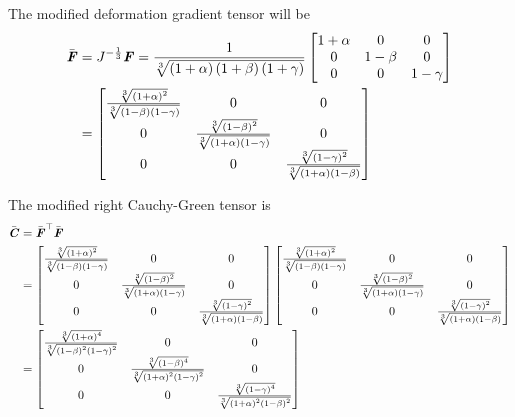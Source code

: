 The modified deformation gradient tensor will be
\begin{equation}
  \begin{split}
    \bar{\boldsymbol{\mathit{F}}}&=J^{-\frac{1}{3}}\boldsymbol{\mathit{F}}=\frac{1}{ \sqrt[3]{\left( 1+\alpha \right)\left( 1+\beta \right)\left( 1+\gamma \right)} }\begin{bmatrix}
      1+\alpha & 0 & 0 \\
      0 & 1-\beta & 0 \\
      0 & 0 & 1-\gamma
    \end{bmatrix}\\
    &=\begin{bmatrix}
    \frac{ \sqrt[3]{\left( 1+\alpha \right)^{2}} }{ \sqrt[3]{\left( 1-\beta \right)\left( 1-\gamma \right)} }
    & 0 & 0 \\
    0 &
    \frac{ \sqrt[3]{\left( 1-\beta \right)^{2}} }{ \sqrt[3]{\left( 1+\alpha \right)\left( 1-\gamma \right)} }
    & 0 \\
    0 & 0 & \frac{ \sqrt[3]{\left( 1-\gamma \right)^{2}} }{ \sqrt[3]{\left( 1+\alpha \right)\left( 1-\beta \right)} }
    \end{bmatrix}
  \end{split}
\end{equation}

The modified right Cauchy-Green tensor is
\begin{equation}
  \begin{split}
    \bar{\boldsymbol{\mathit{C}}} &=  {\bar{\boldsymbol{\mathit{F}}}}^{ \top } \bar{\boldsymbol{\mathit{F}}}\\
    &= \begin{bmatrix}
    \frac{ \sqrt[3]{\left( 1+\alpha \right)^{2}} }{ \sqrt[3]{\left( 1-\beta \right)\left( 1-\gamma \right)} }
    & 0 & 0 \\
    0 &
    \frac{ \sqrt[3]{\left( 1-\beta \right)^{2}} }{ \sqrt[3]{\left( 1+\alpha \right)\left( 1-\gamma \right)} }
    & 0 \\
    0 & 0 & \frac{ \sqrt[3]{\left( 1-\gamma \right)^{2}} }{ \sqrt[3]{\left( 1+\alpha \right)\left( 1-\beta \right)} }
    \end{bmatrix}\begin{bmatrix}
    \frac{ \sqrt[3]{\left( 1+\alpha \right)^{2}} }{ \sqrt[3]{\left( 1-\beta \right)\left( 1-\gamma \right)} }
    & 0 & 0 \\
    0 &
    \frac{ \sqrt[3]{\left( 1-\beta \right)^{2}} }{ \sqrt[3]{\left( 1+\alpha \right)\left( 1-\gamma \right)} }
    & 0 \\
    0 & 0 & \frac{ \sqrt[3]{\left( 1-\gamma \right)^{2}} }{ \sqrt[3]{\left( 1+\alpha \right)\left( 1-\beta \right)} }
    \end{bmatrix}\\
    &=\begin{bmatrix}
    \frac{ \sqrt[3]{\left( 1+\alpha \right)^{4}} }{ \sqrt[3]{\left( 1-\beta \right)^{2}\left( 1-\gamma \right)^{2}} }
    & 0 & 0 \\
    0 & \frac{ \sqrt[3]{\left( 1-\beta \right)^{4}} }{ \sqrt[3]{\left( 1+\alpha \right)^{2}\left( 1-\gamma \right)^{2}} }
    & 0  \\
    0 & 0 & \frac{ \sqrt[3]{\left( 1-\gamma \right)^{4}} }{ \sqrt[3]{\left( 1+\alpha \right)^{2}\left( 1-\beta \right)^{2}} }
    \end{bmatrix}
  \end{split}
\end{equation}

